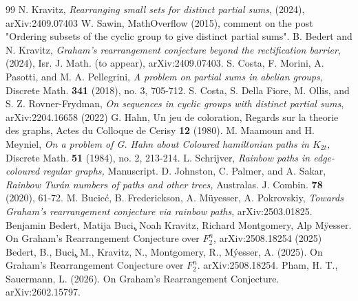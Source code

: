 \documentclass[11pt,a4paper]{article}
\begin{document}
\begin{thebibliography}{99}
 N. Kravitz, \textit{Rearranging small sets for distinct partial sums}, (2024), arXiv:2409.07403
 W. Sawin, MathOverflow (2015), comment on the post "Ordering subsets of the cyclic group to give distinct partial sums".
 B. Bedert and N. Kravitz, \textit{Graham's rearrangement conjecture beyond the rectification barrier}, (2024), Isr. J. Math. (to appear), arXiv:2409.07403.
 S. Costa, F. Morini, A. Pasotti, and M. A. Pellegrini, \textit{A problem on partial sums in abelian groups,} Discrete Math. \textbf{341} (2018), no. 3, 705-712.
 S. Costa, S. Della Fiore, M. Ollis, and S. Z. Rovner-Frydman, \textit{On sequences in cyclic groups with distinct partial sums}, arXiv:2204.16658 (2022)
 G. Hahn, Un jeu de coloration, Regards sur la theorie des graphs, Actes du Colloque de Cerisy \textbf{12} (1980).
 M. Maamoun and H. Meyniel, \textit{On a problem of G. Hahn about Coloured hamiltonian paths in $K_{2t}$,} Discrete Math. \textbf{51} (1984), no. 2, 213-214.
 L. Schrijver, \textit{Rainbow paths in edge-coloured regular graphs,} Manuscript.
 D. Johnston, C. Palmer, and A. Sakar, \textit{Rainbow Tur\'{a}n numbers of paths and other trees,} Australas. J. Combin. \textbf{78} (2020), 61-72.
 M. Bucic\'{c}, B. Frederickson, A. M\"{u}yesser, A. Pokrovskiy, \textit{Towards Graham's rearrangement conjecture via rainbow paths}, arXiv:2503.01825.
 Benjamin Bedert, Matija Buci\c, Noah Kravitz, Richard Montgomery, Alp M\"yesser. On Graham's Rearrangement Conjecture over $F^n_2$, arXiv:2508.18254 (2025)
 Bedert, B., Buci\c, M., Kravitz, N., Montgomery, R., M\'yesser, A. (2025). On Graham's Rearrangement Conjecture over $F^n_2$. arXiv:2508.18254.
 Pham, H. T., Sauermann, L. (2026). On Graham's Rearrangement Conjecture. arXiv:2602.15797.
\end{thebibliography}
\end{document}
